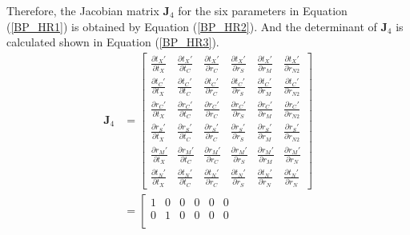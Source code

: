 \documentclass{bmcart}
\begin{document}
\begin{backmatter}
Therefore, the Jacobian matrix ${{\mathbf{J}}_4}$ for the six parameters in Equation (\ref{BP_HR1}) is obtained by Equation (\ref{BP_HR2}). And the determinant of ${{\mathbf{J}}_4}$ is calculated shown in Equation (\ref{BP_HR3}).
\begin{equation}\label{BP_HR2}
\begin{aligned}
{{\mathbf{J}}_4} &= \left[ {\begin{array}{*{20}{c}}
  {\frac{{\partial {t_X}'}}{{\partial {t_X}}}}&{\frac{{\partial {t_X}'}}{{\partial {t_C}}}}&{\frac{{\partial {t_X}'}}{{\partial {r_C}}}}&{\frac{{\partial {t_X}'}}{{\partial {r_S}}}}&{\frac{{\partial {t_X}'}}{{\partial {r_{M}}}}}&{\frac{{\partial {t_X}'}}{{\partial {r_{N2}}}}} \\ 
  {\frac{{\partial {t_C}'}}{{\partial {t_X}}}}&{\frac{{\partial {t_C}'}}{{\partial {t_C}}}}&{\frac{{\partial {t_C}'}}{{\partial {r_C}}}}&{\frac{{\partial {t_C}'}}{{\partial {r_S}}}}&{\frac{{\partial {t_C}'}}{{\partial {r_{M}}}}}&{\frac{{\partial {t_C}'}}{{\partial {r_{N2}}}}} \\ 
  {\frac{{\partial {r_C}'}}{{\partial {t_X}}}}&{\frac{{\partial {r_C}'}}{{\partial {t_C}}}}&{\frac{{\partial {r_C}'}}{{\partial {r_C}}}}&{\frac{{\partial {r_C}'}}{{\partial {r_S}}}}&{\frac{{\partial {r_C}'}}{{\partial {r_{M}}}}}&{\frac{{\partial {r_C}'}}{{\partial {r_{N2}}}}} \\ 
  {\frac{{\partial {r_S}'}}{{\partial {t_X}}}}&{\frac{{\partial {r_S}'}}{{\partial {t_C}}}}&{\frac{{\partial {r_S}'}}{{\partial {r_C}}}}&{\frac{{\partial {r_S}'}}{{\partial {r_S}}}}&{\frac{{\partial {r_S}'}}{{\partial {r_{M}}}}}&{\frac{{\partial {r_S}'}}{{\partial {r_{N2}}}}} \\ 
  {\frac{{\partial {r_{M}}'}}{{\partial {t_X}}}}&{\frac{{\partial {r_{M}}'}}{{\partial {t_C}}}}&{\frac{{\partial {r_{M}}'}}{{\partial {r_C}}}}&{\frac{{\partial {r_{M}}'}}{{\partial {r_S}}}}&{\frac{{\partial {r_{M}}'}}{{\partial {r_{M}}}}}&{\frac{{\partial {r_{M}}'}}{{\partial {r_{N}}}}} \\ 
  {\frac{{\partial {t_{N}}'}}{{\partial {t_X}}}}&{\frac{{\partial {t_{N}}'}}{{\partial {t_C}}}}&{\frac{{\partial {t_{N}}'}}{{\partial {r_C}}}}&{\frac{{\partial {t_{N}}'}}{{\partial {r_S}}}}&{\frac{{\partial {t_{N}}'}}{{\partial {r_{N}}}}}&{\frac{{\partial {t_{N}}'}}{{\partial {r_{N}}}}} 
\end{array}} \right] \\&= \left[ {\begin{array}{*{20}{c}}
  1&0&0&0&0&0 \\ 
  0&1&0&0&0&0 \\ 

\end{array}}
\end{aligned}
\end{equation}
\end{backmatter}
\end{document}
